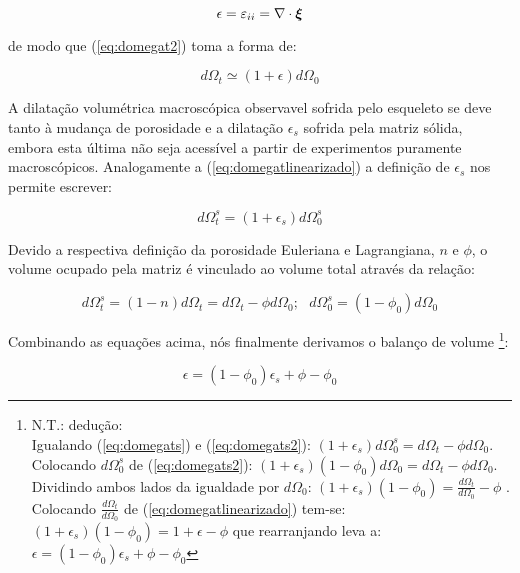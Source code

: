 \documentclass[
	11pt, %
	fleqn, %
	a4paper, %
]{LegrandOrangeBook}
\begin{document}
\begin{equation}
	\label{eq:epsilon}	
	\epsilon = \varepsilon_{ii} = \nabla \cdot \bm{\xi}
\end{equation}

de modo que (\ref{eq:domegat2}) toma a forma de:

\begin{equation}
	\label{eq:domegatlinearizado}	
	d\Omega_t \simeq (1+\epsilon)d\Omega_0
\end{equation}

A dilatação volumétrica macroscópica observavel sofrida pelo esqueleto se deve tanto à mudança de porosidade e a dilatação $\epsilon_s$ sofrida pela matriz sólida, embora esta última não seja acessível a partir de experimentos puramente macroscópicos. Analogamente a (\ref{eq:domegatlinearizado}) a definição de $\epsilon_s$ nos permite escrever:

\begin{equation}
	\label{eq:domegats}	
	d\Omega_t^s = (1+\epsilon_s)d\Omega_0^s
\end{equation}

Devido a respectiva definição da porosidade Euleriana e Lagrangiana, $n$ e $\phi$, o volume ocupado pela matriz é vinculado ao volume total através da relação:

\begin{equation}
	\label{eq:domegats2}	
	d\Omega_t^s = (1-n)d\Omega_t = d\Omega_t - \phi d\Omega_0; ~~~ d\Omega_0^s = (1-\phi_0)d\Omega_0
\end{equation}

Combinando as equações acima, nós finalmente derivamos o balanço de volume \footnote{N.T.: dedução: \\ Igualando (\ref{eq:domegats}) e (\ref{eq:domegats2}): $(1+\epsilon_s)d\Omega_0^s = d\Omega_t - \phi d\Omega_0$. \\ Colocando $d\Omega_0^s$ de (\ref{eq:domegats2}): $(1+\epsilon_s)(1-\phi_0)d\Omega_0 = d\Omega_t - \phi d\Omega_0$.\\ Dividindo ambos lados da igualdade por $d\Omega_0$: $(1+\epsilon_s)(1-\phi_0) = \frac{d\Omega_t}{d\Omega_0} - \phi$
. \\ Colocando $\frac{d\Omega_t}{d\Omega_0}$ de (\ref{eq:domegatlinearizado}) tem-se: $(1+\epsilon_s)(1-\phi_0) = 1+\epsilon - \phi$ que rearranjando leva a: $\epsilon = (1-\phi_0)\epsilon_s + \phi - \phi_0$
}:

\begin{equation}
	\label{eq:epsilongraocompressivel}	
	\epsilon = (1-\phi_0)\epsilon_s + \phi - \phi_0
\end{equation}
\end{document}
